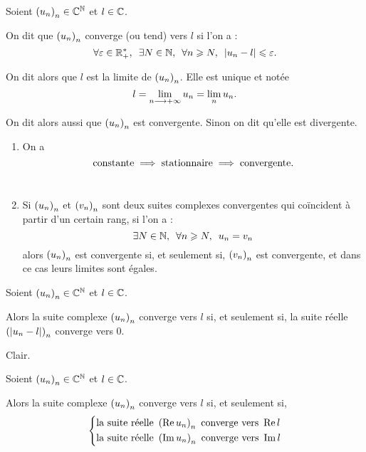 \begin{defprop}
Soient \(\left(u_n\right)_n\in\mathbb{C}^{\mathbb{N}}\) et \(l\in\mathbb{C}\).

On dit que \(\left(u_n\right)_n\) converge (ou tend) vers \(l\) si l'on a : \[\quantifs{\forall\epsilon\in\Rps;\exists N\in\N;\forall n\geq N}\abs{u_n-l}\leq\epsilon.\]

On dit alors que \(l\) est la limite de \(\left(u_n\right)_n\). Elle est unique et notée \[l=\lim_{n\longrightarrow+\infty}u_n=\lim_nu_n.\]

On dit alors aussi que \(\left(u_n\right)_n\) est convergente. Sinon on dit qu'elle est divergente.
\end{defprop}

\begin{rem}
\begin{enumerate}
\item On a \[\text{constante}\implies\text{stationnaire}\implies\text{convergente}.\] \\

\item Si \(\left(u_n\right)_n\) et \(\left(v_n\right)_n\) sont deux suites complexes convergentes qui coïncident à partir d'un certain rang, \cad si l'on a : \[\quantifs{\exists N\in\N;\forall n\geq N}u_n=v_n\] alors \(\left(u_n\right)_n\) est convergente si, et seulement si, \(\left(v_n\right)_n\) est convergente, et dans ce cas leurs limites sont égales. \\
\end{enumerate}
\end{rem}

\begin{prop}
Soient \(\left(u_n\right)_n\in\mathbb{C}^{\mathbb{N}}\) et \(l\in\mathbb{C}\).

Alors la suite complexe \(\left(u_n\right)_n\) converge vers \(l\) si, et seulement si, la suite réelle \(\left(\left\lvert u_n-l\right\rvert\right)_n\) converge vers \(0\).
\end{prop}

\begin{dem}
Clair.
\end{dem}

\begin{theo}
Soient \(\left(u_n\right)_n\in\mathbb{C}^{\mathbb{N}}\) et \(l\in\mathbb{C}\).

Alors la suite complexe \(\left(u_n\right)_n\) converge vers \(l\) si, et seulement si, \[\begin{dcases}\text{la suite réelle }\left(\operatorname{Re} u_n\right)_n\text{ converge vers }\operatorname{Re} l \\ \text{la suite réelle }\left(\operatorname{Im} u_n\right)_n\text{ converge vers }\operatorname{Im} l\end{dcases}\]
\end{theo}

